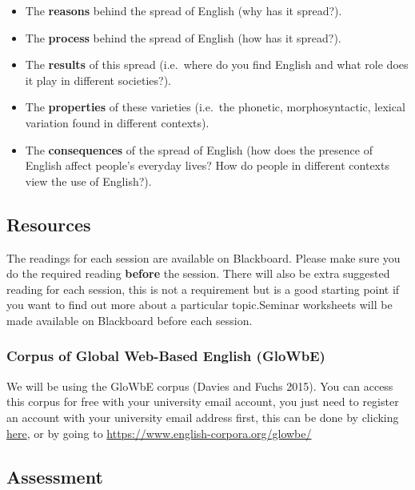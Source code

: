 \documentclass[
]{article}
\providecommand{\tightlist}{%
  \setlength{\itemsep}{0pt}\setlength{\parskip}{0pt}}
\begin{document}
\begin{itemize}
\tightlist
\item
  The \textbf{reasons} behind the spread of English (why has it
  spread?).
\item
  The \textbf{process} behind the spread of English (how has it
  spread?).
\item
  The \textbf{results} of this spread (i.e.~where do you find English
  and what role does it play in different societies?).
\item
  The \textbf{properties} of these varieties (i.e.~the phonetic,
  morphosyntactic, lexical variation found in different contexts).
\item
  The \textbf{consequences} of the spread of English (how does the
  presence of English affect people's everyday lives? How do people in
  different contexts view the use of English?).
\end{itemize}

\hypertarget{resources}{%
\subsection{Resources}\label{resources}}

The readings for each session are available on Blackboard. Please make
sure you do the required reading \textbf{before} the session. There will
also be extra suggested reading for each session, this is not a
requirement but is a good starting point if you want to find out more
about a particular topic.Seminar worksheets will be made available on
Blackboard before each session.

\hypertarget{corpus-of-global-web-based-english-glowbe}{%
\subsubsection{Corpus of Global Web-Based English
(GloWbE)}\label{corpus-of-global-web-based-english-glowbe}}

We will be using the GloWbE corpus (Davies and Fuchs 2015). You can
access this corpus for free with your university email account, you just
need to register an account with your university email address first,
this can be done by clicking
\href{https://www.english-corpora.org/glowbe/}{here}, or by going to
\url{https://www.english-corpora.org/glowbe/}

\hypertarget{assessment}{%
\subsection{Assessment}\label{assessment}}
\end{document}
